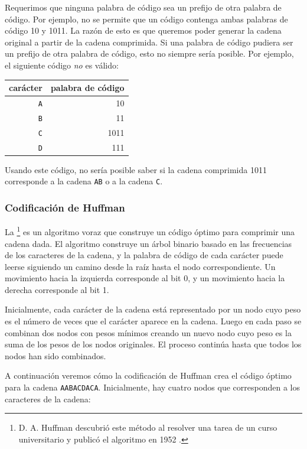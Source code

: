 Requerimos que ninguna palabra de código
sea un prefijo de otra palabra de código.
Por ejemplo, no se permite que un código
contenga ambas palabras de código 10
y 1011.
La razón de esto es que queremos
poder generar la cadena original
a partir de la cadena comprimida.
Si una palabra de código pudiera ser un prefijo de otra palabra de código,
esto no siempre sería posible.
Por ejemplo, el siguiente código \emph{no} es válido:
\begin{center}
\begin{tabular}{rr}
carácter & palabra de código \\
\hline
\texttt{A} & 10 \\
\texttt{B} & 11 \\
\texttt{C} & 1011 \\
\texttt{D} & 111 \\
\end{tabular}
\end{center}
Usando este código, no sería posible saber
si la cadena comprimida 1011 corresponde a
la cadena \texttt{AB} o a la cadena \texttt{C}.


\subsubsection{Codificación de Huffman}

La \footnote{D. A. Huffman descubrió este método
al resolver una tarea de un curso universitario
y publicó el algoritmo en 1952 \cite{huf52}.} es un algoritmo voraz
que construye un código óptimo para
comprimir una cadena dada.
El algoritmo construye un árbol binario
basado en las frecuencias de los caracteres
de la cadena,
y la palabra de código de cada carácter puede leerse
siguiendo un camino desde la raíz hasta
el nodo correspondiente.
Un movimiento hacia la izquierda corresponde al bit 0,
y un movimiento hacia la derecha corresponde al bit 1.

Inicialmente, cada carácter de la cadena está
representado por un nodo cuyo peso es el
número de veces que el carácter aparece en la cadena.
Luego en cada paso se combinan dos nodos con pesos mínimos
creando
un nuevo nodo cuyo peso es la suma de los pesos
de los nodos originales.
El proceso continúa hasta que todos los nodos han sido combinados.

A continuación veremos cómo la codificación de Huffman crea
el código óptimo para la cadena
\texttt{AABACDACA}.
Inicialmente, hay cuatro nodos que corresponden
a los caracteres de la cadena:

